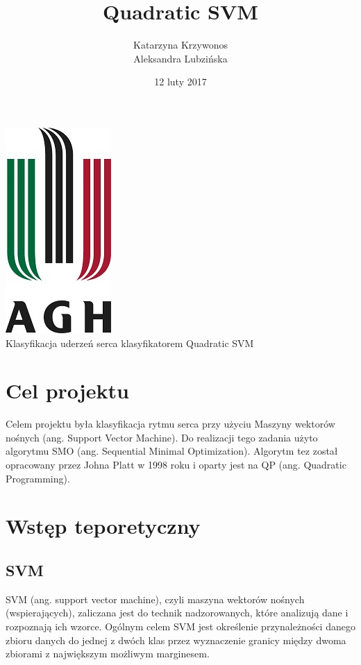 \documentclass[[10pt,a4paper]{article}
\begin{document}
\title{Quadratic SVM}
\author{Katarzyna Krzywonos \\ Aleksandra Lubzińska}
\date{12 luty 2017}
\maketitle


\begin{center}
\includegraphics{logo_agh}\\
\vspace{20mm}
{\LARGE Klasyfikacja uderzeń serca klasyfikatorem Quadratic SVM}\\

\end{center}

\newpage
\tableofcontents
\vspace{10mm}
\newpage
\section*{Cel projektu}
Celem projektu była klasyfikacja rytmu serca przy użyciu Maszyny wektorów nośnych (ang. Support Vector Machine). Do realizacji tego zadania użyto algorytmu SMO (ang. Sequential Minimal Optimization). Algorytm tez został opracowany przez Johna Platt w 1998 roku i oparty jest na QP (ang. Quadratic Programming).

\section{Wstęp teporetyczny}
\subsection{SVM}
SVM (ang. support vector machine), czyli maszyna wektorów nośnych
(wspierających), zaliczana jest do technik nadzorowanych, które analizują dane i rozpoznają
ich wzorce. Ogólnym celem SVM jest określenie przynależności danego zbioru danych do
jednej z dwóch klas przez wyznaczenie granicy między dwoma zbiorami z największym
możliwym marginesem.
\end{document}
